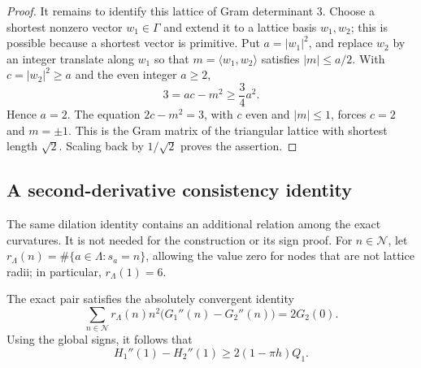 \begin{proof}
It remains to identify this lattice of Gram determinant $3$.  Choose a
shortest nonzero vector $w_1\in\Gamma$ and extend it to a lattice basis
$w_1,w_2$; this is possible because a shortest vector is primitive.
Put $a=|w_1|^2$, and replace $w_2$ by an integer translate along $w_1$
so that $m=\langle w_1,w_2\rangle$ satisfies $|m|\le a/2$.
With $c=|w_2|^2\ge a$ and the even integer $a\ge2$,
\[
 3=ac-m^2\ge\frac34a^2.
\]
Hence $a=2$.  The equation $2c-m^2=3$, with $c$ even and $|m|\le1$,
forces $c=2$ and $m=\pm1$.  This is the Gram matrix of the triangular
lattice with shortest length $\sqrt2$.  Scaling back by $1/\sqrt2$ proves
the assertion.
\end{proof}

\subsection{A second-derivative consistency identity}

The same dilation identity contains an additional relation among the exact
curvatures.  It is not needed for the construction or its sign proof.
For $n\in\mathcal N$, let
$r_\Lambda(n)=\#\{a\in\Lambda:s_a=n\}$, allowing the value zero for nodes
that are not lattice radii; in particular, $r_\Lambda(1)=6$.

\begin{proposition}
\label{normalization:second-poisson}
The exact pair satisfies the absolutely convergent identity
\begin{equation}\label{normalization:curvature-identity}
 \sum_{n\in\mathcal N}r_\Lambda(n)n^2
       \bigl(G_1''(n)-G_2''(n)\bigr)=2G_2(0).
\end{equation}
Using the global signs, it follows that
\begin{equation}\label{normalization:curvature-inequality}
 H_1''(1)-H_2''(1)\ge2(1-\pi h)Q_1.
\end{equation}
\end{proposition}

